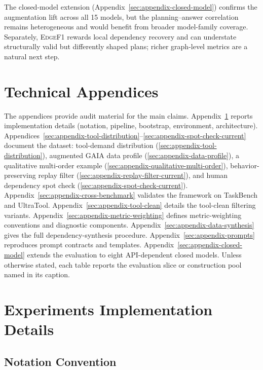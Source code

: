 \documentclass{article}
\providecommand{\metric}[1]{\textsc{#1}}
\begin{document}
The closed-model extension (Appendix~\ref{sec:appendix-closed-model}) confirms the augmentation lift across all 15 models, but the planning--answer correlation remains heterogeneous and would benefit from broader model-family coverage. Separately, \metric{EdgeF1} rewards local dependency recovery and can understate structurally valid but differently shaped plans; richer graph-level metrics are a natural next step.




\clearpage
\appendix

\section*{Technical Appendices}

The appendices provide audit material for the main claims. Appendix~\ref{sec:appendix-experimental-setup} reports implementation details (notation, pipeline, bootstrap, environment, architecture). Appendices~\ref{sec:appendix-tool-distribution}--\ref{sec:appendix-spot-check-current} document the dataset: tool-demand distribution (\ref{sec:appendix-tool-distribution}), augmented GAIA data profile (\ref{sec:appendix-data-profile}), a qualitative multi-order example (\ref{sec:appendix-qualitative-multi-order}), behavior-preserving replay filter (\ref{sec:appendix-replay-filter-current}), and human dependency spot check (\ref{sec:appendix-spot-check-current}). Appendix~\ref{sec:appendix-cross-benchmark} validates the framework on TaskBench and UltraTool. Appendix~\ref{sec:appendix-tool-clean} details the tool-clean filtering variants. Appendix~\ref{sec:appendix-metric-weighting} defines metric-weighting conventions and diagnostic components. Appendix~\ref{sec:appendix-data-synthesis} gives the full dependency-synthesis procedure. Appendix~\ref{sec:appendix-prompts} reproduces prompt contracts and templates. Appendix~\ref{sec:appendix-closed-model} extends the evaluation to eight API-dependent closed models. Unless otherwise stated, each table reports the evaluation slice or construction pool named in its caption.


\section{Experiments Implementation Details}
\label{sec:appendix-experimental-setup}

\subsection{Notation Convention}
\label{sec:appendix-notation}
\end{document}
